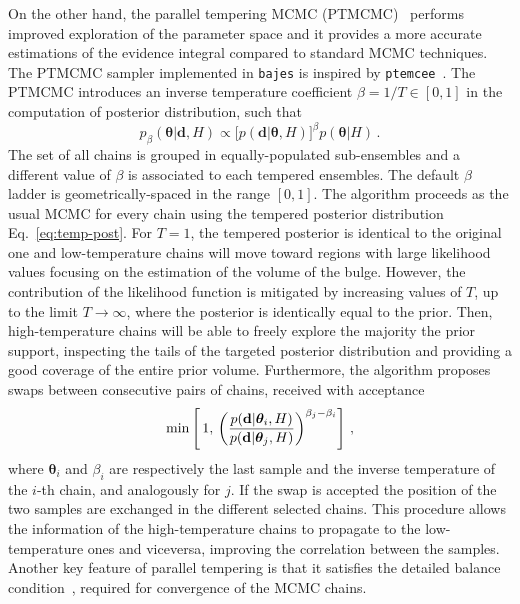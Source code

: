 \documentclass[prd,aps,twocolumn,a4paper,showkeys,nofootinbib,floatfix]{revtex4-1}
\newcommand{\be}{\begin{equation}}
\newcommand{\ee}{\end{equation}}
\def\params{\boldsymbol{\theta}}
\def\data{\textbf{d}}
\newcommand{\bajes}{{\tt bajes}}
\begin{document}
On the other hand, the parallel tempering MCMC (PTMCMC)~\cite{B509983H,PhysRevLett.57.2607,Neal1996}
performs improved exploration of the parameter space
and it provides a more accurate 
estimations of the evidence integral compared to
standard MCMC techniques.
The PTMCMC sampler implemented in {\bajes} 
is inspired by {\tt ptemcee}~\cite{Vousden_2015}.
The PTMCMC
introduces an inverse temperature coefficient $\beta=1/T\in [0,1]$ 
in the computation of posterior distribution, such that 
\be
\label{eq:temp-post}
p_\beta(\params|\data,H) \propto \big[ p(\data|\params,H) \big]^\beta p(\params|H)\,.
\ee
The set of all chains is grouped in equally-populated sub-ensembles
and a different value of $\beta$ is associated to each tempered ensembles.
The default $\beta$ ladder is geometrically-spaced in the range $[0,1]$. 
The algorithm proceeds as the usual MCMC for every chain
using the tempered posterior distribution Eq.~\eqref{eq:temp-post}.
For $T=1$, the tempered posterior is identical to the original one
and low-temperature chains 
will move toward regions with large likelihood values
focusing on the estimation of the volume of the bulge.
However, the contribution of the likelihood function 
is mitigated by increasing values of $T$, 
up to the limit $T\to\infty$, where the posterior is identically equal to the prior.
Then, high-temperature chains will be able 
to freely explore the majority
the prior support,
inspecting the tails of the targeted posterior distribution 
and providing a good coverage of the entire prior volume.
Furthermore, the algorithm proposes swaps  
between consecutive pairs of chains, received with acceptance
\be
\label{eq:ptmcmc}
{\rm min}\left[\,1,\,\left(\frac{p(\data|\params_i,H)}{p(\data|\params_j,H)}\right)^{\beta_j-\beta_i}\right]\,,
\ee
where $\params_i$ and $\beta_i$ are respectively the last sample and the inverse temperature of the $i$-th chain,
and analogously for $j$.
If the swap is accepted the position of the two samples are exchanged in the different selected chains.
This procedure allows the information of the high-temperature chains
to propagate to the low-temperature ones and viceversa,
improving the correlation between the samples.
Another key feature of parallel tempering is that it satisfies the detailed balance condition~\cite{Sambridge:2013},
required for convergence of the MCMC chains.
\end{document}
